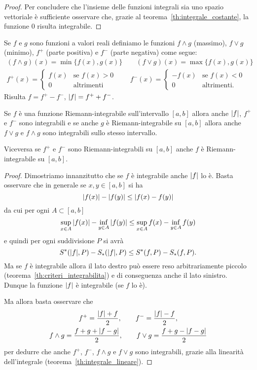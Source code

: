 \begin{proof}
Per concludere che l'insieme delle funzioni integrali sia uno spazio vettoriale
è sufficiente osservare che, grazie al teorema~\ref{th:integrale_costante},
la funzione $0$ risulta integrabile.
\end{proof}

\begin{theorem}
\label{th:reticolo}
Se $f$ e $g$ sono funzioni a valori reali definiamo le
funzioni $f\wedge g$ (massimo), $f \vee g$ (minimo),
$f^+$ (parte positiva) e $f^-$ (parte negativa) come segue:
\begin{gather*}
  (f \wedge g)(x) = \min\{f(x), g(x)\}  \qquad
  (f \vee g)(x) = \max\{f(x), g(x)\} \\
  f^+ (x) =
      \begin{cases}
      f(x) & \text{se $f(x)> 0$}\\
      0 & \text{altrimenti}
      \end{cases} \qquad
  f^- (x) =
      \begin{cases}
      -f(x) & \text{se $f(x)< 0$}\\
      0 & \text{altrimenti.}
      \end{cases}
\end{gather*}
Risulta $f= f^+ - f^-$, ${\left|f\right|}=f^+ + f^-$.

Se $f$ è una funzione Riemann-integrabile sull'intervallo $[a,b]$ allora
anche ${\left|f\right|}$, $f^+$ e $f^-$ sono integrabili e se
anche $g$ è Riemann-integrabile su $[a,b]$ allora anche $f\vee g$ e $f\wedge g$
sono integrabili sullo stesso intervallo.

Viceversa se $f^+$ e $f^-$ sono Riemann-integrabili su $[a,b]$ anche $f$
è Riemann-integrabile su $[a,b]$.
\end{theorem}
%
\begin{proof}
Dimostriamo innanzitutto che se $f$ è integrabile anche ${\left|f\right|}$ lo è.
Basta osservare che in generale se $x,y\in [a,b]$ si ha
\[
  {\left|f(x)\right|}-{\left|f(y)\right|} \le {\left|f(x) - f(y)\right|}
\]
da cui per ogni $A\subset [a,b]$
\[
  \sup_{x\in A} {\left|f(x)\right|} - \inf_{y\in A} {\left|f(y)\right|} \le
  \sup_{x\in A} f(x) - \inf_{y\in A}f(y)
\]
e quindi per ogni suddivisione $P$ si avrà
\[
  S^*({\left|f\right|},P) - S_*({\left|f\right|}, P) \le S^*(f,P) - S_*(f,P).
\]
Ma se $f$ è integrabile allora il lato destro può essere reso
arbitrariamente piccolo (teorema~\ref{th:criteri_integrabilita})
e di conseguenza anche il lato sinistro.
Dunque la funzione ${\left|f\right|}$ è integrabile (se $f$ lo è).

Ma allora basta osservare che
\begin{gather*}
  f^+ = \frac{{\left|f\right|} + f}{2}, \qquad
  f^- = \frac{{\left|f\right|} - f}{2}, \\
  f\wedge g = \frac{f + g + {\left|f-g\right|}}{2}, \qquad
  f\vee g = \frac{f+g - {\left|f-g\right|}}{2}
\end{gather*}
per dedurre che anche $f^+$, $f^-$, $f\wedge g$ e $f\vee g$
sono integrabili,
 grazie
alla linearità dell'integrale (teorema~\ref{th:integrale_lineare}).
\end{proof}

